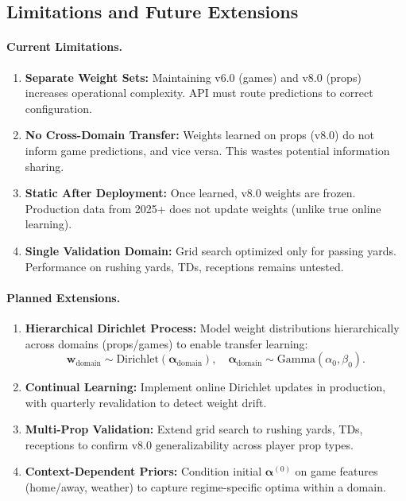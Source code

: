 \subsection{Limitations and Future Extensions}
\label{subsec:dirichlet-limitations}

\paragraph{Current Limitations.}
\begin{enumerate}
\item \textbf{Separate Weight Sets:} Maintaining v6.0 (games) and v8.0 (props) increases operational complexity. API must route predictions to correct configuration.

\item \textbf{No Cross-Domain Transfer:} Weights learned on props (v8.0) do not inform game predictions, and vice versa. This wastes potential information sharing.

\item \textbf{Static After Deployment:} Once learned, v8.0 weights are frozen. Production data from 2025+ does not update weights (unlike true online learning).

\item \textbf{Single Validation Domain:} Grid search optimized only for passing yards. Performance on rushing yards, TDs, receptions remains untested.
\end{enumerate}

\paragraph{Planned Extensions.}
\begin{enumerate}
\item \textbf{Hierarchical Dirichlet Process:} Model weight distributions hierarchically across domains (props/games) to enable transfer learning:
\begin{equation}
\mathbf{w}_{\text{domain}} \sim \text{Dirichlet}(\boldsymbol{\alpha}_{\text{domain}}), \quad \boldsymbol{\alpha}_{\text{domain}} \sim \text{Gamma}(\alpha_0, \beta_0).
\end{equation}

\item \textbf{Continual Learning:} Implement online Dirichlet updates in production, with quarterly revalidation to detect weight drift.

\item \textbf{Multi-Prop Validation:} Extend grid search to rushing yards, TDs, receptions to confirm v8.0 generalizability across player prop types.

\item \textbf{Context-Dependent Priors:} Condition initial $\boldsymbol{\alpha}^{(0)}$ on game features (home/away, weather) to capture regime-specific optima within a domain.
\end{enumerate}

